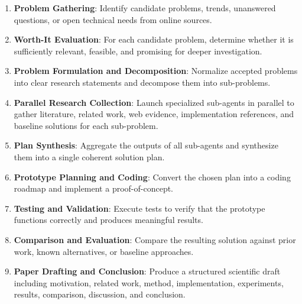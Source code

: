 \documentclass[11pt,a4paper]{article}
\begin{document}
\begin{enumerate}[label=\arabic*.]
    \item \textbf{Problem Gathering}: Identify candidate problems, trends, unanswered questions, or open technical needs from online sources.
    \item \textbf{Worth-It Evaluation}: For each candidate problem, determine whether it is sufficiently relevant, feasible, and promising for deeper investigation.
    \item \textbf{Problem Formulation and Decomposition}: Normalize accepted problems into clear research statements and decompose them into sub-problems.
    \item \textbf{Parallel Research Collection}: Launch specialized sub-agents in parallel to gather literature, related work, web evidence, implementation references, and baseline solutions for each sub-problem.
    \item \textbf{Plan Synthesis}: Aggregate the outputs of all sub-agents and synthesize them into a single coherent solution plan.
    \item \textbf{Prototype Planning and Coding}: Convert the chosen plan into a coding roadmap and implement a proof-of-concept.
    \item \textbf{Testing and Validation}: Execute tests to verify that the prototype functions correctly and produces meaningful results.
    \item \textbf{Comparison and Evaluation}: Compare the resulting solution against prior work, known alternatives, or baseline approaches.
    \item \textbf{Paper Drafting and Conclusion}: Produce a structured scientific draft including motivation, related work, method, implementation, experiments, results, comparison, discussion, and conclusion.
\end{enumerate}
\end{document}

